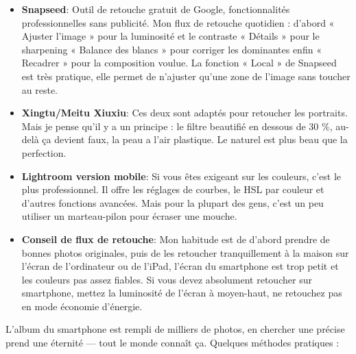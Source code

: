\begin{itemize}
  \item \textbf{Snapseed}: Outil de retouche gratuit de Google, fonctionnalités professionnelles sans publicité. Mon flux de retouche quotidien : d'abord « Ajuster l'image » pour la luminosité et le contraste « Détails » pour le sharpening « Balance des blancs » pour corriger les dominantes enfin « Recadrer » pour la composition voulue. La fonction « Local » de Snapseed est très pratique, elle permet de n'ajuster qu'une zone de l'image sans toucher au reste.
  \item \textbf{Xingtu/Meitu Xiuxiu}: Ces deux sont adaptés pour retoucher les portraits. Mais je pense qu'il y a un principe : le filtre beautifié en dessous de 30 \%, au-delà ça devient faux, la peau a l'air plastique. Le naturel est plus beau que la perfection.
  \item \textbf{Lightroom version mobile}: Si vous êtes exigeant sur les couleurs, c'est le plus professionnel. Il offre les réglages de courbes, le HSL par couleur et d'autres fonctions avancées. Mais pour la plupart des gens, c'est un peu utiliser un marteau-pilon pour écraser une mouche.
  \item \textbf{Conseil de flux de retouche}: Mon habitude est de d'abord prendre de bonnes photos originales, puis de les retoucher tranquillement à la maison sur l'écran de l'ordinateur ou de l'iPad, l'écran du smartphone est trop petit et les couleurs pas assez fiables. Si vous devez absolument retoucher sur smartphone, mettez la luminosité de l'écran à moyen-haut, ne retouchez pas en mode économie d'énergie.
\end{itemize}


L'album du smartphone est rempli de milliers de photos, en chercher une précise prend une éternité — tout le monde connaît ça. Quelques méthodes pratiques :

